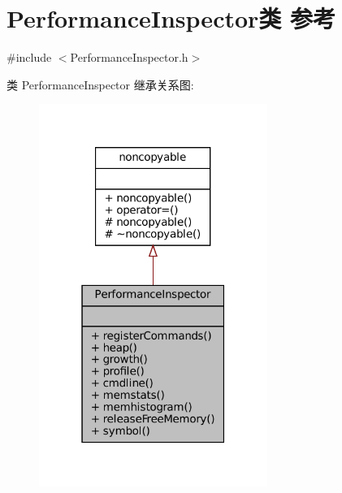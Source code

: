 \hypertarget{classmuduo_1_1net_1_1PerformanceInspector}{}\section{Performance\+Inspector类 参考}
\label{classmuduo_1_1net_1_1PerformanceInspector}


{\ttfamily \#include $<$Performance\+Inspector.\+h$>$}



类 Performance\+Inspector 继承关系图\+:
\nopagebreak
\begin{figure}[H]
\begin{center}
\leavevmode
\includegraphics[width=211pt]{classmuduo_1_1net_1_1PerformanceInspector__inherit__graph}
\end{center}
\end{figure}


